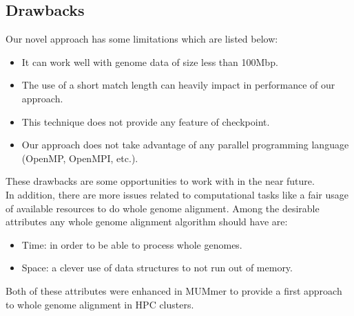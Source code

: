 \documentclass[10pt]{bmc_article}
\newenvironment{bmcformat}{\begin{raggedright}\baselineskip20pt\sloppy\setboolean{publ}{false}}{\end{raggedright}\baselineskip20pt\sloppy}
\begin{document}
\begin{bmcformat}
\subsection*{Drawbacks}
Our novel approach has some limitations which are listed below:
\begin{itemize}
  \item It can work well with genome data of size less than 100Mbp.
  \item The use of a short match length can heavily impact in performance of our approach.
  \item This technique does not provide any feature of checkpoint.
  \item Our approach does not take advantage of any parallel programming language (OpenMP, OpenMPI, etc.).
\end{itemize}
These drawbacks are some opportunities to work with in the near future.\\
In addition, there are more issues related to computational tasks like a fair usage of available resources to do whole genome alignment. Among the desirable attributes any whole genome alignment algorithm should have are:
\begin{itemize}
\item Time: in order to be able to process whole genomes.
\item Space: a clever use of data structures to not run out of memory. 
\end{itemize}
Both of these attributes were enhanced in MUMmer to provide a first approach to whole genome alignment in HPC clusters.


\end{bmcformat}
\end{document}
